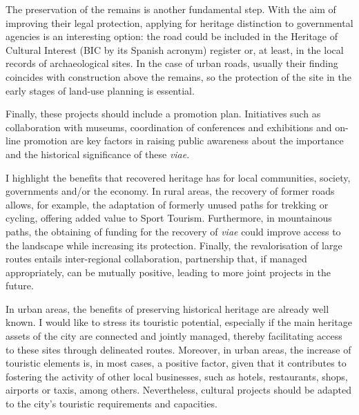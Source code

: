 The preservation of the remains is another fundamental step. With the aim of improving their legal protection, applying for heritage distinction to governmental agencies is an interesting option: the road could be included in the Heritage of Cultural Interest (BIC by its Spanish acronym) register or, at least, in the local records of archaeological sites. In the case of urban roads, usually their finding coincides with construction above the remains, so the protection of the site in the early stages of land-use planning is essential.

Finally, these projects should include a promotion plan. Initiatives such as collaboration with museums, coordination of conferences and exhibitions and on-line promotion are key factors in raising public awareness about the importance and the historical significance of these \textit{viae}.


I  highlight the benefits that recovered heritage has for local communities, society, governments and/or the economy. In rural areas, the recovery of former roads allows, for example, the adaptation of formerly unused paths for trekking or cycling, offering added value to Sport Tourism. Furthermore, in mountainous paths, the obtaining of funding for the recovery of \textit{viae} could improve access to the landscape while increasing its protection. Finally, the revalorisation of large routes entails inter-regional collaboration, partnership that, if managed appropriately, can be mutually positive, leading to more joint projects in the future. 

In urban areas, the benefits of preserving historical heritage are already well known. I would like to stress its touristic potential, especially if the main heritage assets of the city are connected and jointly managed, thereby facilitating access to these sites through delineated routes. Moreover, in urban areas, the increase of touristic elements is, in most cases, a positive factor, given that it contributes to fostering the activity of other local businesses, such as hotels, restaurants, shops, airports or taxis, among others. Nevertheless, cultural projects should be adapted to the city’s touristic requirements and capacities.

